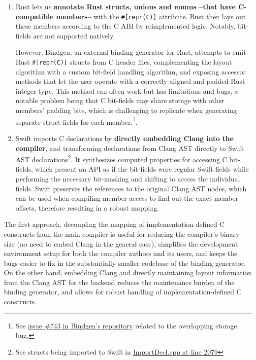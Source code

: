 \begin{enumerate}
    \item Rust lets us \textbf{annotate Rust structs, unions and enums --that have C-compatible members--} with the \texttt{\#[repr(C)]} attribute. Rust then lays out these members according to the C ABI by reimplemented logic\cite{rust-c-layouting}. Notably, bit-fields are not supported natively.
    
    However, Bindgen\cite{rust-bindgen}, an external binding generator for Rust, attempts to emit Rust \texttt{\#[repr(C)]} structs from C header files, complementing the layout algorithm with a custom bit-field handling algorithm, and exposing accessor methods that let the user operate with a correctly aligned and padded Rust integer type. This method can often work but has limitations and bugs, a notable problem being that C bit-fields may share storage with other members' padding bits, which is challenging to replicate when generating separate struct fields for each member.\footnote{See \href{https://github.com/rust-lang/rust-bindgen/issues/743\#issuecomment-321051199}{issue \#743 in Bindgen's repository} related to the overlapping storage bug.}.
    
    \item Swift imports C declarations by \textbf{directly embedding Clang into the compiler}, and transforming declarations from Clang AST directly to Swift AST declarations\footnote{See structs being imported to Swift in \href{https://github.com/swiftlang/swift/blob/9a0a831b0198e1b794a66316487aacef3d692ca4/lib/ClangImporter/ImportDecl.cpp\#L2079}{ImportDecl.cpp at line 2079}}. It synthesizes computed properties for accessing C bit-fields, which present an API as if the bit-fields were regular Swift fields while performing the necessary bit-masking and shifting to access the individual fields\cite{how-swift-imports-c-structs}. Swift preserves the references to the original Clang AST nodes, which can be used when compiling member access to find out the exact member offsets, therefore resulting in a robust mapping.
\end{enumerate}

The first approach, decoupling the mapping of implementation-defined C constructs from the main compiler is useful for reducing the compiler's binary size (no need to embed Clang in the general case), simplifies the development environment setup for both the compiler authors and its users, and keeps the bugs easier to fix in the substantially smaller codebase of the binding generator. On the other hand, embedding Clang and directly maintaining layout information from the Clang AST for the backend reduces the maintenance burden of the binding generator, and allows for robust handling of implementation-defined C constructs.

